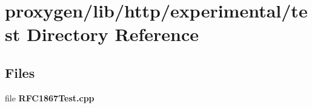 \section{proxygen/lib/http/experimental/test Directory Reference}
\label{dir_1e49aa694a10ccc7b4b0910e294ea196}
\subsection*{Files}
\begin{DoxyCompactItemize}
\item 
file {\bf R\+F\+C1867\+Test.\+cpp}
\end{DoxyCompactItemize}
